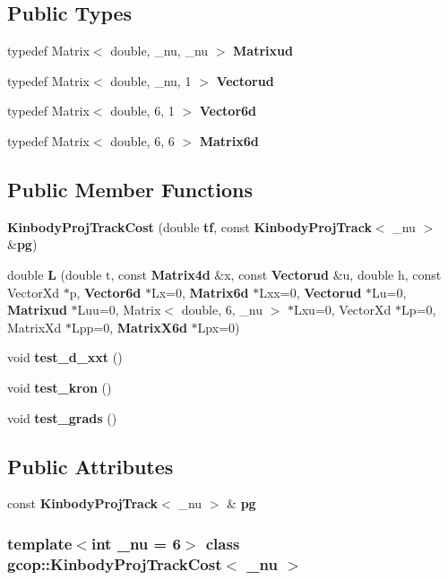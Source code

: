 \subsection*{\-Public \-Types}
\begin{DoxyCompactItemize}
\item 
typedef \-Matrix$<$ double, \-\_\-nu, \-\_\-nu $>$ {\bf \-Matrixud}
\item 
typedef \-Matrix$<$ double, \-\_\-nu, 1 $>$ {\bf \-Vectorud}
\item 
typedef \-Matrix$<$ double, 6, 1 $>$ {\bf \-Vector6d}
\item 
typedef \-Matrix$<$ double, 6, 6 $>$ {\bf \-Matrix6d}
\end{DoxyCompactItemize}
\subsection*{\-Public \-Member \-Functions}
\begin{DoxyCompactItemize}
\item 
{\bf \-Kinbody\-Proj\-Track\-Cost} (double {\bf tf}, const {\bf \-Kinbody\-Proj\-Track}$<$ \-\_\-nu $>$ \&{\bf pg})
\item 
double {\bf \-L} (double t, const {\bf \-Matrix4d} \&x, const {\bf \-Vectorud} \&u, double h, const \-Vector\-Xd $\ast$p, {\bf \-Vector6d} $\ast$\-Lx=0, {\bf \-Matrix6d} $\ast$\-Lxx=0, {\bf \-Vectorud} $\ast$\-Lu=0, {\bf \-Matrixud} $\ast$\-Luu=0, \-Matrix$<$ double, 6, \-\_\-nu $>$ $\ast$\-Lxu=0, \-Vector\-Xd $\ast$\-Lp=0, \-Matrix\-Xd $\ast$\-Lpp=0, {\bf \-Matrix\-X6d} $\ast$\-Lpx=0)
\item 
void {\bf test\-\_\-d\-\_\-xxt} ()
\item 
void {\bf test\-\_\-kron} ()
\item 
void {\bf test\-\_\-grads} ()
\end{DoxyCompactItemize}
\subsection*{\-Public \-Attributes}
\begin{DoxyCompactItemize}
\item 
const {\bf \-Kinbody\-Proj\-Track}$<$ \-\_\-nu $>$ \& {\bf pg}
\end{DoxyCompactItemize}
\subsubsection*{template$<$int \-\_\-nu = 6$>$ class gcop\-::\-Kinbody\-Proj\-Track\-Cost$<$ \-\_\-nu $>$}




